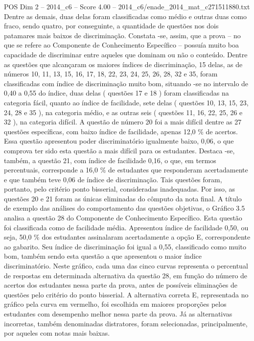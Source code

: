 \begin{textsample}{POS Dim 2 – 2014\_c6 – Score 4.00 – 2014\_c6/enade\_2014\_mat\_c271511880.txt}
Dentre as demais, duas delas foram classificadas como médio e outras duas como fraco, sendo quatro, por conseguinte, a quantidade de questões nos dois patamares mais baixos de discriminação.
Constata -se, assim, que a prova – no que se refere ao Componente de Conhecimento Específico – possuía muito boa capacidade de discriminar entre aqueles que dominam ou não o conteúdo.
Dentre as questões que alcançaram os maiores índices de discriminação, 15 delas, as de números 10, 11, 13, 15, 16, 17, 18, 22, 23, 24, 25, 26, 28, 32 e 35, foram classificadas com índice de discriminação muito bom, situando -se no intervalo de 0,40 a 0,55 do índice, duas delas ( questões 17 e 18 ) foram classificadas na categoria fácil, quanto ao índice de facilidade, sete delas ( questões 10, 13, 15, 23, 24, 28 e 35 ), na categoria médio, e as outras seis ( questões 11, 16, 22, 25, 26 e 32 ), na categoria difícil.
A questão de número 20 foi a mais difícil dentre as 27 questões específicas, com baixo índice de facilidade, apenas 12,0 \% de acertos.
Essa questão apresentou poder discriminatório igualmente baixo, 0,06, o que comprova ter sido esta questão a mais difícil para os estudantes.
Destaca -se, também, a questão 21, com índice de facilidade 0,16, o que, em termos percentuais, corresponde a 16,0 \% de estudantes que responderam acertadamente e que também teve 0,06 de índice de discriminação.
Tais questões foram, portanto, pelo critério ponto bisserial, consideradas inadequadas.
Por isso, as questões 20 e 21 foram as únicas eliminadas do cômputo da nota final.
A título de exemplo das análises do comportamento das questões objetivas, o Gráfico 3.5 analisa a questão 28 do Componente de Conhecimento Específico.
Esta questão foi classificada como de facilidade média.
Apresentou índice de facilidade 0,50, ou seja, 50,0 \% dos estudantes assinalaram acertadamente a opção E, correspondente ao gabarito.
Seu índice de discriminação foi igual a 0,55, classificado como muito bom, também sendo esta questão a que apresentou o maior índice discriminatório.
Neste gráfico, cada uma das cinco curvas representa o percentual de respostas em determinada alternativa da questão 28, em função do número de acertos dos estudantes nessa parte da prova, antes de possíveis eliminações de questões pelo critério do ponto bisserial.
A alternativa correta E, representada no gráfico pela curva em vermelho, foi escolhida em maiores proporções pelos estudantes com desempenho melhor nessa parte da prova.
Já as alternativas incorretas, também denominadas distratores, foram selecionadas, principalmente, por aqueles com notas mais baixas.

\end{textsample}
